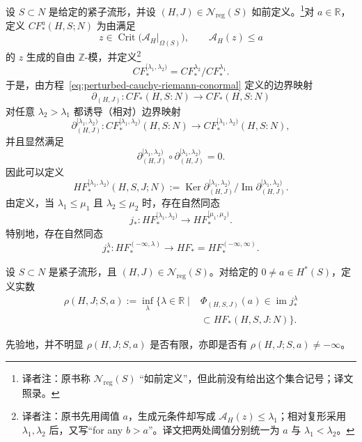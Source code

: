 设 $S\subset N$ 是给定的紧子流形，并设 $(H,J)\in\mathcal N_{\mathrm{reg}}(S)$ 如前定义。\footnote{译者注：原书称 $\mathcal N_{\mathrm{reg}}(S)$ “如前定义”，但此前没有给出这个集合记号；译文照录。}对 $a\in\mathbb R$，定义 $CF_*^a(H,S;N)$ 为由满足
\[
  z\in\operatorname{Crit}\bigl(\mathcal A_H|_{\Omega(S)}\bigr),
  \qquad
  \mathcal A_H(z)\le a
\]
的 $z$ 生成的自由 $\mathbb Z$-模，并定义\footnote{译者注：原书先用阈值 $a$，生成元条件却写成 $\mathcal A_H(z)\le\lambda_1$；相对复形采用 $\lambda_1,\lambda_2$ 后，又写“for any $b>a$”。译文把两处阈值分别统一为 $a$ 与 $\lambda_1<\lambda_2$。}
\[
  CF_*^{[\lambda_1,\lambda_2)}
  =CF_*^{\lambda_2}/CF_*^{\lambda_1}.
\]
于是，由方程~\eqref{eq:perturbed-cauchy-riemann-conormal} 定义的边界映射
\[
  \partial_{(H,J)}:CF_*(H,S:N)\longrightarrow CF_*(H,S:N)
\]
对任意 $\lambda_2>\lambda_1$ 都诱导（相对）边界映射
\[
  \partial_{(H,J)}^{[\lambda_1,\lambda_2)}:
  CF_*^{[\lambda_1,\lambda_2)}(H,S:N)
  \longrightarrow
  CF_*^{[\lambda_1,\lambda_2)}(H,S:N),
\]
并且显然满足
\[
  \partial_{(H,J)}^{[\lambda_1,\lambda_2)}
  \circ
  \partial_{(H,J)}^{[\lambda_1,\lambda_2)}=0.
\]
\stfhIndex{I003}{00-hf-filtered}{$HF_*^{[\lambda_1,\lambda_2)}(H,S,J;N)$}
因此可以定义\termRelativeHomologyGroup{}
\[
  HF_*^{[\lambda_1,\lambda_2)}(H,S,J;N)
  :=\operatorname{Ker}\partial_{(H,J)}^{[\lambda_1,\lambda_2)}
  /\operatorname{Im}\partial_{(H,J)}^{[\lambda_1,\lambda_2)}.
\]
由定义，当 $\lambda_1\le\mu_1$ 且 $\lambda_2\le\mu_2$ 时，存在自然同态
\[
  j_*:HF_*^{[\lambda_1,\lambda_2)}
  \longrightarrow HF_*^{[\mu_1,\mu_2)}.
\]
特别地，存在自然同态
\begin{equation}
  j_*^\lambda:HF_*^{(-\infty,\lambda)}
  \longrightarrow HF_*=HF_*^{(-\infty,\infty)}.
\label{eq:filtered-to-total-floer-homology}
\end{equation}

\begin{definition}
\label{def:lagrangian-spectral-number-regular}
设 $S\subset N$ 是紧子流形，且 $(H,J)\in\mathcal N_{\mathrm{reg}}(S)$。对给定的 $0\ne a\in H^*(S)$，定义实数
\[
\begin{split}
  \rho(H,J;S,a)
  :=\inf_\lambda\{\lambda\in\mathbb R\mid {}&
  \Phi_{(H,S,J)}(a)\in\operatorname{im}j_*^\lambda\\
  &\subset HF_*(H,S,J:N)\}.
\end{split}
\]
\end{definition}

先验地，并不明显 $\rho(H,J;S,a)$ 是否有限，亦即是否有 $\rho(H,J;S,a)\ne-\infty$。

